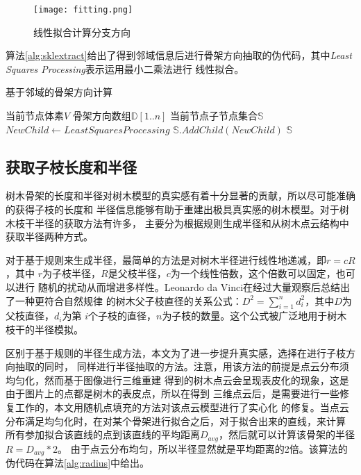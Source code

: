 \begin{figure}[H]
	\centering
	\texttt{[image: fitting.png]}
	\caption{线性拟合计算分支方向}
	\label{fig:fitting}
\end{figure}

算法\ref{alg:sklextract}给出了得到邻域信息后进行骨架方向抽取的伪代码，其中\textit{Least Squares Processing}表示运用最小二乘法进行
线性拟合。

\begin{algorithm}[H]
	\caption{基于邻域的骨架方向计算}
	\label{alg:sklextract}
	\begin{algorithmic}[1] 
		\Require 当前节点体素$V$
		\Require 骨架方向数组$\mathbb{D}[1..n]$
		\Ensure 当前节点子节点集合$\mathbb{S}$
			\State $NewChild\gets Least Squares Processing$
			\State $\mathbb{S}.AddChild(NewChild)$
		\EndFor
		\State \Return $\mathbb{S}$
	\end{algorithmic}
\end{algorithm}

\subsection{获取子枝长度和半径}
树木骨架的长度和半径对树木模型的真实感有着十分显著的贡献，所以尽可能准确的获得子枝的长度和
半径信息能够有助于重建出极具真实感的树木模型。对于树木枝干半径的获取方法有许多，
主要分为根据规则生成半径和从树木点云结构中获取半径两种方式。

对于基于规则来生成半径，最简单的方法是对树木半径进行线性地递减，即$r=cR$，其中
$r$为子枝半径，$R$是父枝半径，$c$为一个线性倍数，这个倍数可以固定，也可以进行
随机的扰动从而增进多样性。Leonardo da Vinci在经过大量观察后总结出了一种更符合自然规律
的树木父子枝直径的关系公式：$D^2=\sum_{i=1}^n{d_i^2}$，其中$D$为父枝直径，$d_i$为第
$i$个子枝的直径，$n$为子枝的数量。这个公式被广泛地用于树木枝干的半径模拟。

区别于基于规则的半径生成方法，本文为了进一步提升真实感，选择在进行子枝方向抽取的同时，
同样进行半径抽取的方法。注意，用该方法的前提是点云分布须均匀化，然而基于图像进行三维重建
得到的树木点云会呈现表皮化的现象，这是由于图片上的点都是树木的表皮点，所以在得到
三维点云后，是需要进行一些修复工作的，本文用随机点填充的方法对该点云模型进行了实心化
的修复。当点云分布满足均匀化时，在对某个骨架进行拟合之后，对于拟合出来的直线，来计算
所有参加拟合该直线的点到该直线的平均距离$D_{avg}$，然后就可以计算该骨架的半径$R=D_{avg}*2$。
由于点云分布均匀，所以半径显然就是平均距离的2倍。该算法的伪代码在算法\ref{alg:radius}中给出。\\

